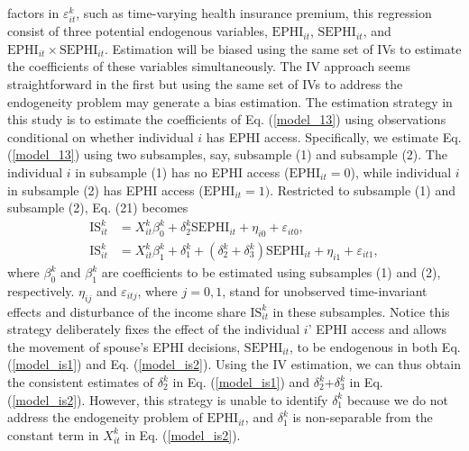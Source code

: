 \documentclass[legno,11pt]{article}
\begin{document}
factors in $\varepsilon_{it}^{k}$, such as time-varying health
insurance premium, this regression consist of three potential
endogenous variables, $\text{EPHI}_{it}$, $\text{SEPHI}_{it}$, and
$\text{EPHI}_{it}\times\text{SEPHI}_{it}$. Estimation will be biased
using the same set of IVs to estimate the coefficients of these
variables simultaneously. The IV approach seems straightforward in
the first but using the same set of IVs to address the endogeneity
problem may generate a bias estimation. The estimation strategy in
this study is to estimate the coefficients of Eq. (\ref{model_13})
using observations conditional on whether individual $i$ has EPHI
access. Specifically, we estimate Eq. (\ref{model_13}) using two
subsamples, say, subsample (1) and subsample (2). The individual $i$
in subsample (1) has no EPHI access ($\text{EPHI}_{it}=0$), while
individual $i$ in subsample (2) has EPHI access
($\text{EPHI}_{it}=1)$. Restricted to subsample (1) and subsample
(2), Eq. (21) becomes
\begin{align}
  \text{IS}_{it}^{k}&=X^{k}_{it}\beta_{0}^{k}+\delta_{2}^{k}\text{SEPHI}_{it}
+\eta_{i0}+\varepsilon_{it0},
\label{model_is1}\\
  \text{IS}_{it}^{k}&=X^{k}_{it}\beta_{1}^{k}+\delta_{1}^{k}+(\delta_{2}^{k}
+\delta_{3}^{k})\text{SEPHI}_{it}+\eta_{i1}+\varepsilon_{it1},
\label{model_is2}
\end{align}
where $\beta_{0}^{k}$ and $\beta_{1}^{k}$ are coefficients to be
estimated using subsamples (1) and (2), respectively. $\eta_{ij}$
and $\varepsilon_{itj}$, where $j=0,1$, stand for unobserved
time-invariant effects and disturbance of the income share
$\text{IS}_{it}^{k}$ in these subsamples. Notice this strategy
deliberately fixes the effect of the individual $i$' EPHI access and
allows the movement of spouse's EPHI decisions, $\text{SEPHI}_{it}$,
to be endogenous in both Eq. (\ref{model_is1}) and Eq.
(\ref{model_is2}). Using the IV estimation, we can thus obtain the
consistent estimates of $\delta^{k}_{2}$ in Eq. (\ref{model_is1})
and $\delta^{k}_{2}$+$\delta^{k}_{3}$ in Eq. (\ref{model_is2}).
However, this strategy is unable to identify  $\delta_{1}^{k}$
because we do not address the endogeneity problem of
$\text{EPHI}_{it}$, and $\delta_{1}^{k}$ is non-separable from the
constant term in $X^{k}_{it}$ in Eq. (\ref{model_is2}).
\par
\end{document}
